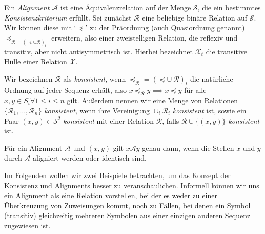 \begin{definition}
	Ein \emph{Alignment} $\mathcal{A}$ ist eine Äquivalenzrelation auf der Menge $\mathcal{S}$, die ein bestimmtes \emph{Konsistenzkriterium} erfüllt. Sei zunächst $\mathcal{R}$ eine beliebige binäre Relation auf $\mathcal{S}$. Wir können diese mit `$\preceq$' zu der Präordnung (auch Quasiordnung genannt) $\preceq_{\mathcal{R}=(\preceq \cup \mathcal{R})_t}$ erweitern, also einer zweistelligen Relation, die reflexiv und transitiv, aber nicht antisymmetrisch ist. Hierbei bezeichnet $\mathcal{X}_t$ die transitive Hülle einer Relation $\mathcal{X}$. 
	
	Wir bezeichnen $\mathcal{R}$ als \emph{konsistent}, wenn $\preceq_{\mathcal{R}}=(\preceq \cup\: \mathcal{R})_t$ die natürliche Ordnung auf jeder Sequenz erhält, also $x \preceq_{\mathcal{R}} y \implies x \preceq y$ für alle $x,y \in S_i \forall 1\leq i\leq n$ gilt. Außerdem nennen wir eine Menge von Relationen $\{\mathcal{R}_1, \dots, \mathcal{R}_n\}$ \emph{konsistent}, wenn ihre Vereinigung $\cup_i \mathcal{R}_i$ \emph{konsistent} ist, sowie ein Paar $(x,y) \in \mathcal{S}^2$ \emph{konsistent} mit einer Relation $\mathcal{R}$, falls $\mathcal{R} \cup \{(x,y)\}$ \emph{konsistent} ist.
	
	Für ein Alignment $\mathcal{A}$ und $(x,y)$ gilt $x\mathcal{A}y$ genau dann, wenn die Stellen $x$ und $y$ durch $\mathcal{A}$ aligniert werden oder identisch sind.
\end{definition}

Im Folgenden wollen wir zwei Beispiele betrachten, um das Konzept der Konsistenz und Alignments besser zu veranschaulichen. Informell können wir uns ein Alignment als eine Relation vorstellen, bei der es weder zu einer Überkreuzung von Zuweisungen kommt, noch zu Fällen, bei denen ein Symbol (transitiv) gleichzeitig mehreren Symbolen aus einer einzigen anderen Sequenz zugewiesen ist.

